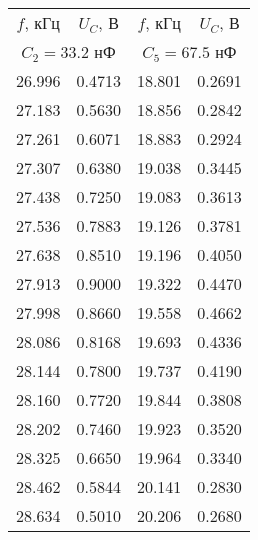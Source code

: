 \begin{tabular}{cc|cc}
\toprule
$f$, кГц & $U_{C}$, В & $f$, кГц & $U_{C}$, В \\
\multicolumn{2}{c}{$C_2=33.2$ нФ} & \multicolumn{2}{c}{$C_5=67.5$ нФ} \\
\midrule
26.996 & 0.4713 & 18.801 & 0.2691 \\
27.183 & 0.5630 & 18.856 & 0.2842 \\
27.261 & 0.6071 & 18.883 & 0.2924 \\
27.307 & 0.6380 & 19.038 & 0.3445 \\
27.438 & 0.7250 & 19.083 & 0.3613 \\
27.536 & 0.7883 & 19.126 & 0.3781 \\
27.638 & 0.8510 & 19.196 & 0.4050 \\
27.913 & 0.9000 & 19.322 & 0.4470 \\
27.998 & 0.8660 & 19.558 & 0.4662 \\
28.086 & 0.8168 & 19.693 & 0.4336 \\
28.144 & 0.7800 & 19.737 & 0.4190 \\
28.160 & 0.7720 & 19.844 & 0.3808 \\
28.202 & 0.7460 & 19.923 & 0.3520 \\
28.325 & 0.6650 & 19.964 & 0.3340 \\
28.462 & 0.5844 & 20.141 & 0.2830 \\
28.634 & 0.5010 & 20.206 & 0.2680 \\
\bottomrule
\end{tabular}

